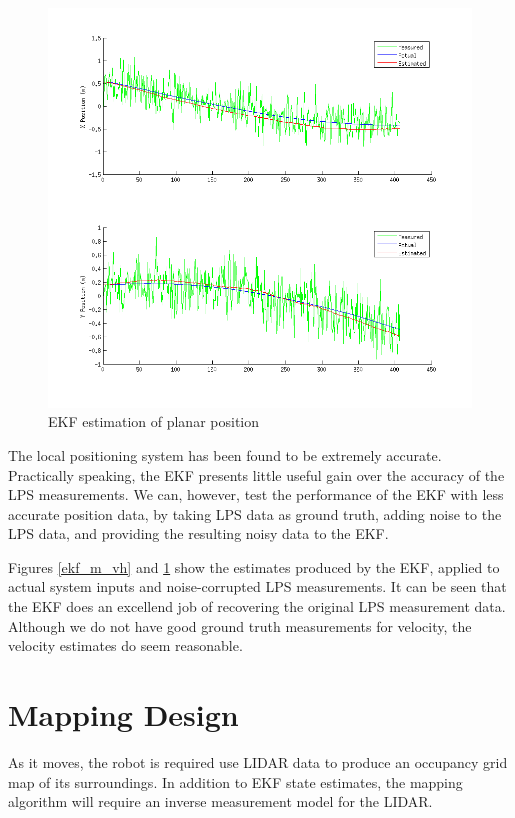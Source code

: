 \documentclass[11pt]{article} %
\begin{document}
\begin{figure} [hbt]
 \centering
 \includegraphics[scale=0.60]{ekf_meas_xy.png}
 \caption{EKF estimation of planar position}
 \label{ekf_m_xy}
\end{figure}

The local positioning system has been found to be extremely accurate.  Practically speaking, the EKF presents little useful gain over the accuracy of the LPS measurements.  We can, however, test the performance of the EKF with less accurate position data, by taking LPS data as ground truth, adding noise to the LPS data, and providing the resulting noisy data to the EKF.

Figures \ref{ekf_m_vh} and \ref{ekf_m_xy} show the estimates produced by the EKF, applied to actual system inputs and noise-corrupted LPS measurements.  It can be seen that the EKF does an excellend job of recovering the original LPS measurement data.  Although we do not have good ground truth measurements for velocity, the velocity estimates do seem reasonable.

\clearpage

\section{Mapping Design}
As it moves, the robot is required use LIDAR data to produce an occupancy grid map of its surroundings.  In addition to EKF state estimates, the mapping algorithm will require an inverse measurement model for the LIDAR.
\end{document}
